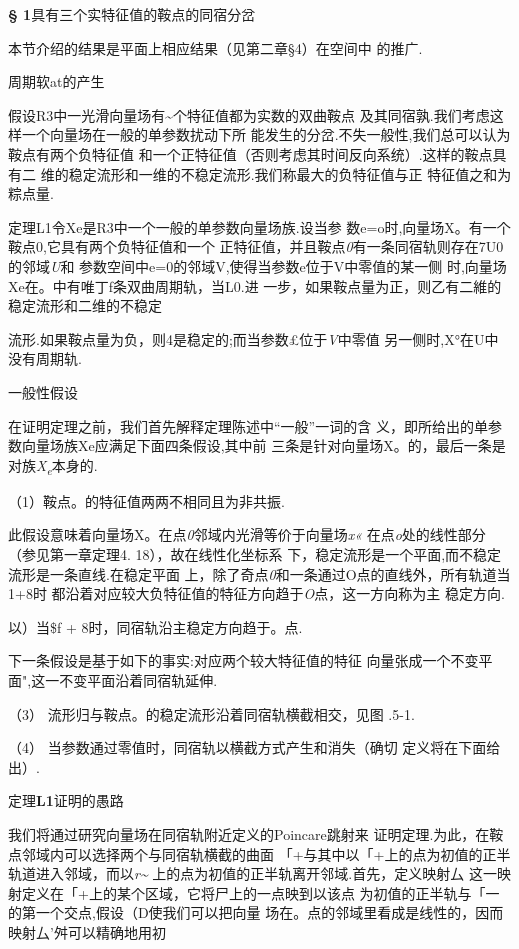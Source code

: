 \documentclass{article}
\begin{document}
\protect\hypertarget{bookmark239}{}{}\textbf{§
1}具有三个实特征值的鞍点的同宿分岔

本节介绍的结果是平面上相应结果（见第二章§4）在空间中 的推广.

周期软at的产生

假设R3中一光滑向量场有\textasciitilde{}个特征值都为实数的双曲鞍点
及其同宿孰.我们考虑这样一个向量场在一般的单参数扰动下所
能发生的分岔.不失一般性,我们总可以认为鞍点有两个负特征值
和一个正特征值（否则考虑其时间反向系统）.这样的鞍点具有二
维的稳定流形和一维的不稳定流形.我们称最大的负特征值与正
特征值之和为粽点量.

定理L1令Xe是R3中一个一般的单参数向量场族.设当参
数e=o时,向量场X。有一个鞍点0,它具有两个负特征值和一个
正特征值，并且鞍点\emph{0}有一条同宿轨则存在7U0的邻域\emph{U}和
参数空间中e=0的邻域V,使得当参数e位于V中零值的某一侧
时,向量场Xe在。中有唯丁f条双曲周期轨，当L0.进
一步，如果鞍点量为正，则乙有二維的稳定流形和二维的不稳定

流形.如果鞍点量为负，则4是稳定的;而当参数£位于\emph{V}中零值
另一侧时,X°在U中没有周期轨.

一般性假设

在证明定理之前，我们首先解释定理陈述中``一般''一词的含
义，即所给出的单参数向量场族Xe应满足下面四条假设,其中前
三条是针对向量场X。的，最后一条是对族\emph{X\textsubscript{e}}本身的.

（1）鞍点。的特征值两两不相同且为非共振.

此假设意味着向量场X。在点\emph{0}邻域内光滑等价于向量场\emph{x«}
在点\emph{o}处的线性部分（参见第一章定理4. 18），故在线性化坐标系
下，稳定流形是一个平面,而不稳定流形是一条直线.在稳定平面
上，除了奇点\emph{0}和一条通过O点的直线外，所有轨道当1+8时
都沿着对应较大负特征值的特征方向趋于\emph{O}点，这一方向称为主 稳定方向.

以）当\$f + 8时，同宿轨沿主稳定方向趋于。点.

下一条假设是基于如下的事实:对应两个较大特征值的特征
向量张成一个不变平面",这一不变平面沿着同宿轨延伸.

（3） 流形归与鞍点。的稳定流形沿着同宿轨横截相交，见图 .5-1.

（4） 当参数通过零值时，同宿轨以横截方式产生和消失（确切
定义将在下面给出）.

定理\textbf{L1}证明的愚路

我们将通过研究向量场在同宿轨附近定义的Poincare跳射来
证明定理.为此，在鞍点邻域内可以选择两个与同宿轨横截的曲面
「+与其中以「+上的点为初值的正半轨道进入邻域，而以\emph{r\textasciitilde{}}
上的点为初值的正半轨离开邻域.首先，定义映射厶
这一映射定义在「+上的某个区域，它将尸上的一点映到以该点
为初值的正半轨与「一的第一个交点,假设（D使我们可以把向量
场在。点的邻域里看成是线性的，因而映射厶'舛可以精确地用初
\end{document}
